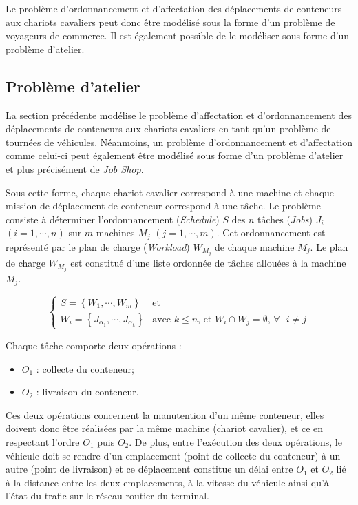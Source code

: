 Le problème d'ordonnancement et d'affectation des déplacements de conteneurs aux chariots cavaliers peut donc être modélisé sous la forme d'un problème de voyageurs de commerce. Il est également possible de le modéliser sous forme d'un problème d'atelier.

\subsection{Problème d'atelier}

La section précédente modélise le problème d'affectation et d'ordonnancement des déplacements de conteneurs aux chariots cavaliers en tant qu'un problème de tournées de véhicules. Néanmoins, un problème d'ordonnancement et d'affectation comme celui-ci peut également être modélisé sous forme d'un problème d'atelier et plus précisément de \textit{Job Shop}.

Sous cette forme, chaque chariot cavalier correspond à une machine et chaque mission de déplacement de conteneur correspond à une tâche. Le problème consiste à déterminer l'ordonnancement (\textit{Schedule}) $S$ des $n$ tâches (\textit{Jobs}) $J_i$ $(i=1,\cdots,n)$ sur $m$ machines $M_j$ $(j=1,\cdots,m)$. Cet ordonnancement est représenté par le plan de charge (\textit{Workload}) $W_{M_j}$ de chaque machine $M_j$. Le plan de charge $W_{M_j}$ est constitué d'une liste ordonnée de tâches allouées à la machine $M_j$.

\begin{equation}
 \begin{cases}
  S = \left\{W_1,\cdots,W_m\right\} & \text{et}\\
  W_i = \left\{J_{\alpha_1},\cdots,J_{\alpha_k}\right\} & \text{avec } k \leq n\text{, et } W_i \cap W_j = \emptyset\text{, } \forall \text{ } i \neq j
 \end{cases}
\end{equation}


Chaque tâche comporte deux opérations :
\begin{itemize}
 \item $O_1$ : collecte du conteneur;
 \item $O_2$ : livraison du conteneur.
\end{itemize}

Ces deux opérations concernent la manutention d'un même conteneur, elles doivent donc être réalisées par la même machine (chariot cavalier), et ce en respectant l'ordre $O_1$ puis $O_2$. De plus, entre l'exécution des deux opérations, le véhicule doit se rendre d'un emplacement (point de collecte du conteneur) à un autre (point de livraison) et ce déplacement constitue un délai entre $O_1$ et $O_2$ lié à la distance entre les deux emplacements, à la vitesse du véhicule ainsi qu'à l'état du trafic sur le réseau routier du terminal.

